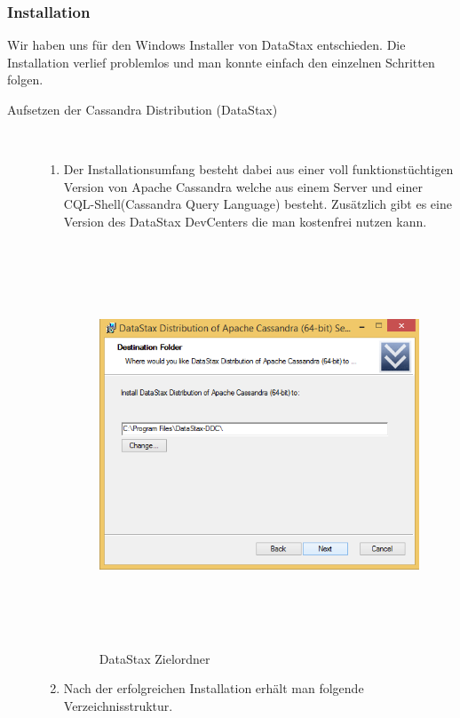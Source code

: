 \documentclass[a4paper, 12pt]{scrartcl}
\begin{document}
\subsubsection{Installation}
Wir haben uns für den Windows Installer von DataStax entschieden. Die Installation verlief problemlos und man konnte einfach den einzelnen Schritten folgen.
\begin{description}
   \item[Aufsetzen der Cassandra Distribution (DataStax)]~\par
   \begin{enumerate}
      \item Der Installationsumfang besteht dabei aus einer voll funktionstüchtigen Version von Apache Cassandra welche aus einem Server und einer CQL-Shell(Cassandra Query Language) besteht. Zusätzlich gibt es eine Version des DataStax DevCenters die man kostenfrei nutzen kann. 

\begin{figure}[H]
\centering
\includegraphics[height=12cm, width=15cm, keepaspectratio]{cass1.png}
\caption{DataStax Zielordner}
\end{figure}    


      \item Nach der erfolgreichen Installation erhält man folgende Verzeichnisstruktur. 


\end{enumerate}
\end{description}
\end{document}
